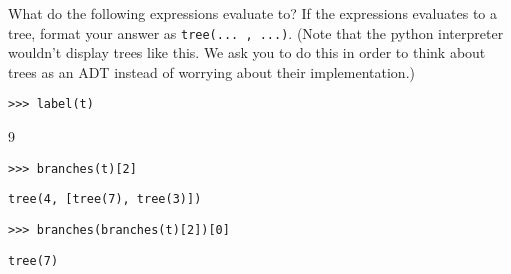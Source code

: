 \begin{blocksection}
\question What do the following expressions evaluate to?
If the expressions evaluates to a tree, format your answer as
\lstinline{tree(... , ...)}. 
(Note that the python interpreter wouldn't display trees like this.
We ask you to do this in order to think about trees as an ADT 
instead of worrying about their implementation.)

\begin{lstlisting}
>>> label(t)
\end{lstlisting}
\begin{solution}[.25in]
9
\end{solution}

\begin{lstlisting}
>>> branches(t)[2]
\end{lstlisting}
\begin{solution}[.25in]
\begin{lstlisting}
tree(4, [tree(7), tree(3)])
\end{lstlisting}
\end{solution}

\begin{lstlisting}
>>> branches(branches(t)[2])[0]
\end{lstlisting}
\begin{solution}[.25in]
\begin{lstlisting}
tree(7)
\end{lstlisting}
\end{solution}
\end{blocksection}
